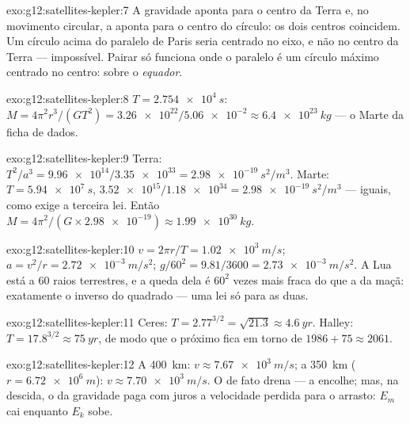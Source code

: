 \begin{solution}{exo:g12:satellites-kepler:7}
A gravidade aponta para o centro da Terra e, no movimento circular, a
 aponta para o centro do círculo: os dois centros
coincidem. Um círculo acima do paralelo de Paris seria centrado no eixo,
e não no centro da Terra --- impossível. Pairar só funciona onde o
paralelo é um círculo máximo centrado no centro: sobre o \emph{equador}.
\end{solution}

\begin{solution}{exo:g12:satellites-kepler:8}
$T = \qty{2.754e4}{s}$: $M = 4\pi^2 r^3/(GT^2) =
\num{3.26e22}/\num{5.06e-2} \approx \qty{6.4e23}{kg}$ --- o Marte da
ficha de dados.
\end{solution}

\begin{solution}{exo:g12:satellites-kepler:9}
Terra: $T^2/a^3 = \num{9.96e14}/\num{3.35e33} = \qty{2.98e-19}{s^2/m^3}$.
Marte: $T = \qty{5.94e7}{s}$, $\num{3.52e15}/\num{1.18e34} =
\qty{2.98e-19}{s^2/m^3}$ --- iguais, como exige a terceira lei. Então
$M = 4\pi^2/(G \times \num{2.98e-19}) \approx \qty{1.99e30}{kg}$.
\end{solution}

\begin{solution}{exo:g12:satellites-kepler:10}
$v = 2\pi r/T = \qty{1.02e3}{m/s}$; $a = v^2/r = \qty{2.72e-3}{m/s^2}$;
$g/60^2 = 9.81/3600 = \qty{2.73e-3}{m/s^2}$. A Lua está a $60$ raios
terrestres, e a queda dela é $60^2$ vezes mais fraca do que a da maçã:
exatamente o inverso do quadrado --- uma lei só para as duas.
\end{solution}

\begin{solution}{exo:g12:satellites-kepler:11}
Ceres: $T = 2.77^{3/2} = \sqrt{21.3} \approx \qty{4.6}{yr}$. Halley:
$T = 17.8^{3/2} \approx \qty{75}{yr}$, de modo que o próximo 
fica em torno de $1986 + 75 \approx 2061$.
\end{solution}

\begin{solution}{exo:g12:satellites-kepler:12}
A \qty{400}{km}: $v \approx \qty{7.67e3}{m/s}$; a \qty{350}{km}
($r = \qty{6.72e6}{m}$): $v \approx \qty{7.70e3}{m/s}$. O  de fato
drena  --- a  encolhe; mas, na descida, o 
da gravidade paga com juros a velocidade perdida para o arrasto: $E_m$
cai enquanto $E_k$ sobe.
\end{solution}

